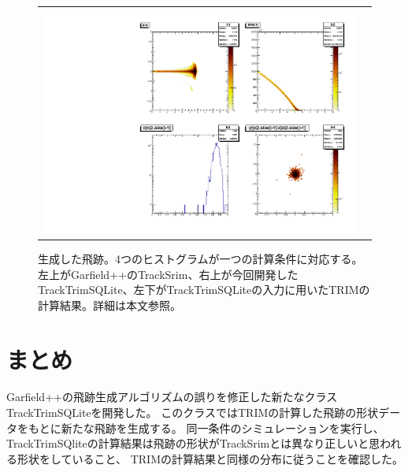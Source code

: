 \documentclass [11pt,a4paper,dvipdfmx] {jarticle}
\begin{document}
\begin{figure}[H]
\begin{center}
\begin{tabular}{c c}
\begin{minipage}{0.45\linewidth}
        \end{minipage}
        \\
        \begin{minipage}{0.45\linewidth}   
            \begin{center}
            \includegraphics[width=\linewidth]{./pic/trim_raw.pdf}
            \end{center}
        \end{minipage}
    \end{tabular}
\end{center}
    \caption{生成した飛跡。4つのヒストグラムが一つの計算条件に対応する。左上がGarfield++のTrackSrim、右上が今回開発したTrackTrimSQLite、左下がTrackTrimSQLiteの入力に用いたTRIMの計算結果。詳細は本文参照。}
    \label{fig:reflectivity}
\end{figure}




\section{まとめ}
Garfield++の飛跡生成アルゴリズムの誤りを修正した新たなクラスTrackTrimSQLiteを開発した。
このクラスではTRIMの計算した飛跡の形状データをもとに新たな飛跡を生成する。
同一条件のシミュレーションを実行し、
TrackTrimSQliteの計算結果は飛跡の形状がTrackSrimとは異なり正しいと思われる形状をしていること、
TRIMの計算結果と同様の分布に従うことを確認した。

% 

\newpage

\appendix
\end{document}
